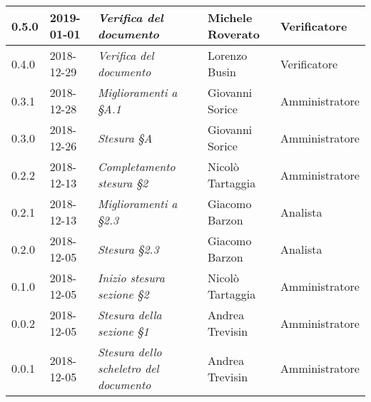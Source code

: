 \begin{longtable}{C{2cm}|C{2.5cm}|C{4.5cm}|C{2.5cm}|C{3cm}}
		0.5.0 & 2019-01-01 & \emph{Verifica del documento} & Michele Roverato & Verificatore \\
		\hline
		
		0.4.0 & 2018-12-29 & \emph{Verifica del documento} & Lorenzo Busin & Verificatore \\
		\hline
		
		0.3.1 & 2018-12-28 & \emph{Miglioramenti a §A.1} & Giovanni Sorice & Amministratore \\
		\hline
		
		0.3.0 & 2018-12-26 & \emph{Stesura §A} & Giovanni Sorice & Amministratore \\
		\hline
		
		0.2.2 & 2018-12-13 & \emph{Completamento stesura §2} & Nicolò Tartaggia & Amministratore \\
		\hline
		
		0.2.1 & 2018-12-13 & \emph{Miglioramenti a §2.3} & Giacomo Barzon & Analista \\
		\hline
		
		0.2.0 & 2018-12-05 & \emph{Stesura §2.3} & Giacomo Barzon & Analista \\
		\hline
		
		0.1.0 & 2018-12-05 & \emph{Inizio stesura sezione §2} & Nicolò Tartaggia & Amministratore \\
		\hline
		
		0.0.2 & 2018-12-05 & \emph{Stesura della sezione §1} & Andrea Trevisin & Amministratore \\
		\hline
		
		0.0.1 & 2018-12-05 & \emph{Stesura dello scheletro del documento} & Andrea Trevisin & Amministratore \\
		
	\end{longtable}


\clearpage